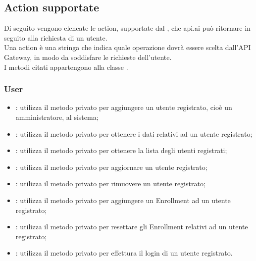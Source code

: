 \subsection{Action supportate} \label{action}
Di seguito vengono elencate le action, supportate dal , che api.ai può ritornare in seguito alla richiesta di un utente. \\
Una action è una stringa che indica quale operazione dovrà essere scelta dall'API Gateway, in modo da soddisfare le richieste dell'utente.\\
I metodi citati appartengono alla classe .
\subsubsection{User}
\begin{itemize}
\item {}: utilizza il metodo privato  per aggiungere un utente registrato, cioè un amministratore, al sistema;

\item {}: utilizza il metodo privato  per ottenere i dati relativi ad un utente registrato;

\item {}: utilizza il metodo privato  per ottenere la lista degli utenti registrati;

\item {}: utilizza il metodo privato  per aggiornare un utente registrato;

\item {}: utilizza il metodo privato  per rimuovere un utente registrato;

\item {}: utilizza il metodo privato  per aggiungere un Enrollment ad un utente registrato;

\item {}: utilizza il metodo privato  per resettare gli Enrollment relativi ad un utente registrato;

\item {}: utilizza il metodo privato  per effettura il login di un utente registrato.

\end{itemize}
